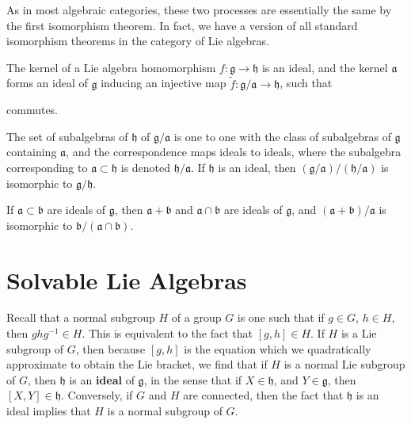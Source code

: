 As in most algebraic categories, these two processes are essentially the same by the first isomorphism theorem. In fact, we have a version of all standard isomorphism theorems in the category of Lie algebras.

\begin{theorem}
    The kernel of a Lie algebra homomorphism $f: \mathfrak{g} \to \mathfrak{h}$ is an ideal, and the kernel $\mathfrak{a}$ forms an ideal of $\mathfrak{g}$ inducing an injective map $\tilde{f}: \mathfrak{g}/\mathfrak{a} \to \mathfrak{h}$, such that
    \begin{center}
    \end{center}
    commutes.
\end{theorem}

\begin{theorem}
    The set of subalgebras of $\mathfrak{h}$ of $\mathfrak{g}/\mathfrak{a}$ is one to one with the class of subalgebras of $\mathfrak{g}$ containing $\mathfrak{a}$, and the correspondence maps ideals to ideals, where the subalgebra corresponding to $\mathfrak{a} \subset \mathfrak{h}$ is denoted $\mathfrak{h}/\mathfrak{a}$. If $\mathfrak{h}$ is an ideal, then $(\mathfrak{g}/\mathfrak{a})/(\mathfrak{h}/\mathfrak{a})$ is isomorphic to $\mathfrak{g}/\mathfrak{h}$.
\end{theorem}

\begin{theorem}
    If $\mathfrak{a} \subset \mathfrak{b}$ are ideals of $\mathfrak{g}$, then $\mathfrak{a} + \mathfrak{b}$ and $\mathfrak{a} \cap \mathfrak{b}$ are ideals of $\mathfrak{g}$, and $(\mathfrak{a} + \mathfrak{b})/\mathfrak{a}$ is isomorphic to $\mathfrak{b}/(\mathfrak{a} \cap \mathfrak{b})$.
\end{theorem}





\section{Solvable Lie Algebras}

Recall that a normal subgroup $H$ of a group $G$ is one such that if $g \in G$, $h \in H$, then $ghg^{-1} \in H$. This is equivalent to the fact that $[g,h] \in H$. If $H$ is a Lie subgroup of $G$, then because $[g,h]$ is the equation which we quadratically approximate to obtain the Lie bracket, we find that if $H$ is a normal Lie subgroup of $G$, then $\mathfrak{h}$ is an {\bf ideal} of $\mathfrak{g}$, in the sense that if $X \in \mathfrak{h}$, and $Y \in \mathfrak{g}$, then $[X,Y] \in \mathfrak{h}$. Conversely, if $G$ and $H$ are connected, then the fact that $\mathfrak{h}$ is an ideal implies that $H$ is a normal subgroup of $G$.

